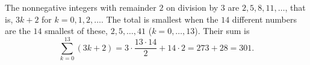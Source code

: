 The nonnegative integers with remainder $2$ on division by $3$ are $2,5,8,11,\dots$, that is, $3k+2$ for $k=0,1,2,\dots$. The total is smallest when the $14$ different numbers are the $14$ smallest of these, $2,5,\dots,41$ ($k=0,\dots,13$). Their sum is
\[\sum_{k=0}^{13}(3k+2)=3\cdot\dfrac{13\cdot14}{2}+14\cdot2=273+28=\boxed{301}.\]
